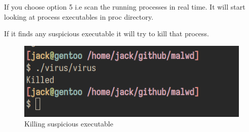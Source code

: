 \documentclass[11pt]{article}
\begin{document}
If you choose option 5 i.e scan the running processes in real time. It will start looking at process executables in proc directory.

If it finds any suspicious executable it will try to kill that process.
\begin{figure}[htbp]
\centering
\includegraphics[width=.9\linewidth]{./images/1.png}
\caption{\label{fig:org7bacdde}Killing suspicious executable}
\end{figure}
\end{document}
